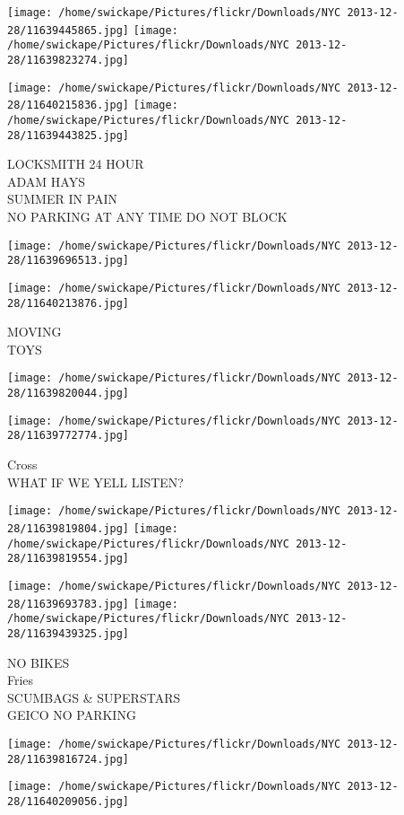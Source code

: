 \documentclass[10pt,letterpaper]{article}
\begin{document}
\texttt{[image: /home/swickape/Pictures/flickr/Downloads/NYC 2013-12-28/11639445865.jpg]}
\texttt{[image: /home/swickape/Pictures/flickr/Downloads/NYC 2013-12-28/11639823274.jpg]}

\texttt{[image: /home/swickape/Pictures/flickr/Downloads/NYC 2013-12-28/11640215836.jpg]}
\texttt{[image: /home/swickape/Pictures/flickr/Downloads/NYC 2013-12-28/11639443825.jpg]}

LOCKSMITH 24 HOUR\\
ADAM HAYS\\
SUMMER IN PAIN\\
NO PARKING AT ANY TIME DO NOT BLOCK
\pagebreak

\texttt{[image: /home/swickape/Pictures/flickr/Downloads/NYC 2013-12-28/11639696513.jpg]}

\vspace{0.25in}
\texttt{[image: /home/swickape/Pictures/flickr/Downloads/NYC 2013-12-28/11640213876.jpg]}

MOVING\\
TOYS
\pagebreak

\texttt{[image: /home/swickape/Pictures/flickr/Downloads/NYC 2013-12-28/11639820044.jpg]}

\vspace{0.25in}
\texttt{[image: /home/swickape/Pictures/flickr/Downloads/NYC 2013-12-28/11639772774.jpg]}

Cross\\
WHAT IF WE YELL LISTEN?
\pagebreak

\texttt{[image: /home/swickape/Pictures/flickr/Downloads/NYC 2013-12-28/11639819804.jpg]}
\texttt{[image: /home/swickape/Pictures/flickr/Downloads/NYC 2013-12-28/11639819554.jpg]}

\texttt{[image: /home/swickape/Pictures/flickr/Downloads/NYC 2013-12-28/11639693783.jpg]}
\texttt{[image: /home/swickape/Pictures/flickr/Downloads/NYC 2013-12-28/11639439325.jpg]}

NO BIKES\\
Fries\\
SCUMBAGS \& SUPERSTARS\\
GEICO NO PARKING
\pagebreak

\texttt{[image: /home/swickape/Pictures/flickr/Downloads/NYC 2013-12-28/11639816724.jpg]}

\vspace{0.25in}
\texttt{[image: /home/swickape/Pictures/flickr/Downloads/NYC 2013-12-28/11640209056.jpg]}
\end{document}
